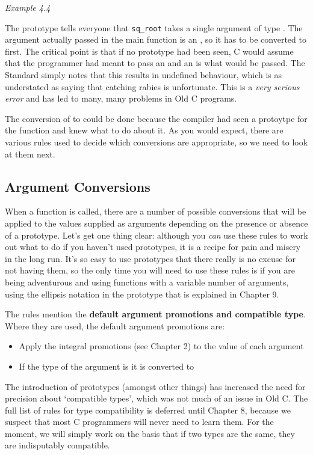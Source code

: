 \begin{center}\textit{Example 4.4}\end{center}


   The prototype tells everyone that \texttt{sq\_root} takes a single
    argument of type \double. The argument actually passed in
    the main function is an \kint, so it has to be converted to
    \double{} first. The critical point is that if no prototype
    had been seen, C would assume that the programmer had meant to pass an
    \kint{} and an \kint{} is what would be passed. The
    Standard simply notes that this results in undefined behaviour, which is
    as understated as saying that catching rabies is unfortunate. This is a
    \textit{very serious error} and has led to many, many problems in Old C
    programs.


   The conversion of \kint{} to \double{} could be
    done because the compiler had seen a protoytpe for the function and knew
    what to do about it. As you would expect, there are various rules used
    to decide which conversions are appropriate, so we need to look at them
    next.



  \subsection{Argument Conversions}
   

   When a function is called, there are a number of possible conversions
    that will be applied to the values supplied as arguments depending on
    the presence or absence of a prototype. Let's get one thing clear:
    although you \textit{can} use these rules to work out what to do if you
    haven't used prototypes, it is a recipe for pain and misery in the long
    run. It's so easy to use prototypes that there really is no excuse for
    not having them, so the only time you will need to use these rules is if
    you are being adventurous and using functions with a variable number of
    arguments, using the ellipsis notation in the prototype that is
    explained in Chapter 9.


   The rules mention the \textbf{default argument promotions and compatible
     type}. Where they are used, the default argument promotions
    are:

   \begin{itemize}
    \item Apply the integral promotions (see Chapter 2) to the
     value of each argument
    \item If the type of the argument is \float{} it is converted to
     \double{}
   \end{itemize}
   The introduction of prototypes (amongst other things) has increased
    the need for precision about `compatible types', which was not
    much of an issue in Old C. The full list of rules for type compatibility
    is deferred until Chapter 8, because we suspect that most C
    programmers will never need to learn them. For the moment, we will
    simply work on the basis that if two types are the same, they are
    indisputably compatible.


